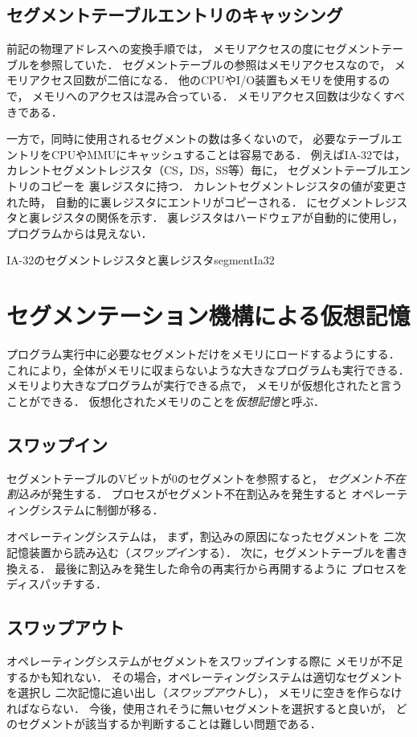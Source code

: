 \subsection{セグメントテーブルエントリのキャッシング}
前記の物理アドレスへの変換手順では，
メモリアクセスの度にセグメントテーブルを参照していた．
セグメントテーブルの参照はメモリアクセスなので，
メモリアクセス回数が二倍になる．
他のCPUやI/O装置もメモリを使用するので，
メモリへのアクセスは混み合っている．
メモリアクセス回数は少なくすべきである．

一方で，同時に使用されるセグメントの数は多くないので，
必要なテーブルエントリをCPUやMMUにキャッシュすることは容易である．
例えばIA-32では，
カレントセグメントレジスタ（CS，DS，SS等）毎に，
セグメントテーブルエントリのコピーを
裏レジスタ\cite{ia32SegmentHiddenReg}に持つ．
カレントセグメントレジスタの値が変更された時，
自動的に裏レジスタにエントリがコピーされる．
にセグメントレジスタと裏レジスタの関係を示す．
裏レジスタはハードウェアが自動的に使用し，
プログラムからは見えない．

{IA-32のセグメントレジスタと裏レジスタ}{segmentIa32}

\section{セグメンテーション機構による仮想記憶}
プログラム実行中に必要なセグメントだけをメモリにロードするようにする．
これにより，全体がメモリに収まらないような大きなプログラムも実行できる．
メモリより大きなプログラムが実行できる点で，
メモリが仮想化されたと言うことができる．
仮想化されたメモリのことを\emph{仮想記憶}と呼ぶ．

\subsection{スワップイン}
セグメントテーブルのVビットが0のセグメントを参照すると，
\emph{セグメント不在割込み}が発生する．
プロセスがセグメント不在割込みを発生すると
オペレーティングシステムに制御が移る．

オペレーティングシステムは，
まず，割込みの原因になったセグメントを
二次記憶装置から読み込む（\emph{スワップイン}する）．
次に，セグメントテーブルを書き換える．
最後に割込みを発生した命令の再実行から再開するように
プロセスをディスパッチする．

\subsection{スワップアウト}
オペレーティングシステムがセグメントをスワップインする際に
メモリが不足するかも知れない．
その場合，オペレーティングシステムは適切なセグメントを選択し
二次記憶に追い出し（\emph{スワップアウト}し），
メモリに空きを作らなければならない．
今後，使用されそうに無いセグメントを選択すると良いが，
どのセグメントが該当するか判断することは難しい問題である．

